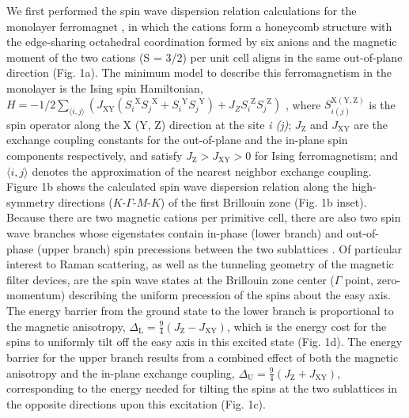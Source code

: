 \documentclass[prl, preprint, superscriptaddress]{revtex4-1}
\begin{document}
We first performed the spin wave dispersion relation calculations for the monolayer ferromagnet , in which the  cations form a honeycomb structure with the edge-sharing octahedral coordination formed by six  anions and the magnetic moment of the two  cations (S = 3/2) per unit cell aligns in the same out-of-plane direction (Fig. 1a). The minimum model to describe this ferromagnetism in the monolayer  is the Ising spin Hamiltonian, $H=-1/2 \sum_{\langle i,j \rangle} (J_\mathrm{XY} ({S_i}^\mathrm{X} {S_j}^\mathrm{X} + {S_i}^\mathrm{Y} {S_j}^\mathrm{Y})+ J_Z {S_i}^\mathrm{Z} {S_j}^\mathrm{Z})$ , where ${S^\mathrm{X (Y,Z)}_{i (j)}}$ is the spin operator along the X (Y, Z) direction at the  site \textit{i (j)}; $J_\mathrm{Z}$ and $J_\mathrm{XY}$ are the exchange coupling constants for the out-of-plane and the in-plane spin components respectively, and satisfy $J_\mathrm{Z}>J_\mathrm{XY}>0$ for Ising ferromagnetism; and $\langle i,j \rangle$ denotes the approximation of the nearest neighbor exchange coupling. Figure 1b shows the calculated spin wave dispersion relation along the high-symmetry directions ($K$-$\varGamma$-$M$-$K$) of the first Brillouin zone (Fig. 1b inset). Because there are two magnetic  cations per primitive cell, there are also two spin wave branches whose eigenstates contain in-phase (lower branch) and out-of-phase (upper branch) spin precessions between the two sublattices \cite{Pershoguba2018}. Of particular interest to Raman scattering, as well as the tunneling geometry of the magnetic filter devices, are the spin wave states at the Brillouin zone center ($\varGamma$  point, zero-momentum) describing the uniform precession of the spins about the easy axis. The energy barrier from the ground state to the lower branch is proportional to the magnetic anisotropy, $\Delta_\mathrm{L}=\frac{9}{4}  (J_\mathrm{Z} - J_\mathrm{XY})$, which is the energy cost for the spins to uniformly tilt off the easy axis in this excited state (Fig. 1d). The energy barrier for the upper branch results from a combined effect of both the magnetic anisotropy and the in-plane exchange coupling, $\Delta_\mathrm{U}=\frac{9}{4} (J_\mathrm{Z}+J_\mathrm{XY})$, corresponding to the energy needed for tilting the spins at the two  sublattices in the opposite directions upon this excitation (Fig. 1c).
\end{document}
